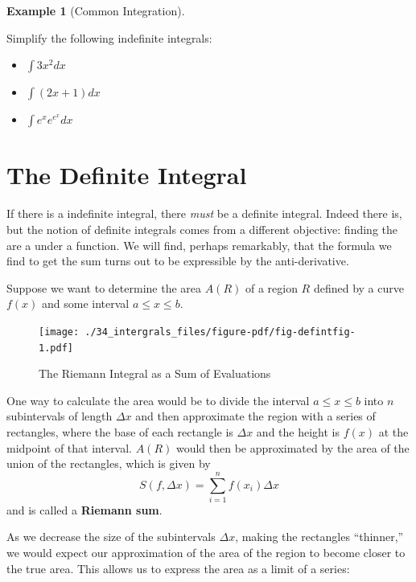 \documentclass[
  letterpaper,
]{book}
\providecommand{\tightlist}{%
  \setlength{\itemsep}{0pt}\setlength{\parskip}{0pt}}\usepackage{longtable,booktabs,array}
\theoremstyle{definition}
\theoremstyle{definition}
\newtheorem{example}{Example}[chapter]
\theoremstyle{plain}
\theoremstyle{definition}
\theoremstyle{plain}
\theoremstyle{plain}
\theoremstyle{remark}
\begin{document}
\leavevmode{}%
\begin{example}[Common Integration]\label{exm-}

Simplify the following indefinite integrals:

\begin{itemize}
\tightlist
\item
  \(\int 3x^2 dx\)
\item
  \(\int (2x+1)dx\)
\item
  \(\int e^x e^{e^x} dx\)
\end{itemize}

\end{example}

\hypertarget{the-definite-integral}{%
\section{The Definite Integral}\label{the-definite-integral}}

If there is a indefinite integral, there \emph{must} be a definite
integral. Indeed there is, but the notion of definite integrals comes
from a different objective: finding the are a under a function. We will
find, perhaps remarkably, that the formula we find to get the sum turns
out to be expressible by the anti-derivative.

Suppose we want to determine the area \(A(R)\) of a region \(R\) defined
by a curve \(f(x)\) and some interval \(a\le x \le b\).

\begin{figure}

{\centering \texttt{[image: ./34\_intergrals\_files/figure-pdf/fig-defintfig-1.pdf]}

}

\caption{\label{fig-defintfig}The Riemann Integral as a Sum of
Evaluations}

\end{figure}

One way to calculate the area would be to divide the interval
\(a\le x\le b\) into \(n\) subintervals of length \(\Delta x\) and then
approximate the region with a series of rectangles, where the base of
each rectangle is \(\Delta x\) and the height is \(f(x)\) at the
midpoint of that interval. \(A(R)\) would then be approximated by the
area of the union of the rectangles, which is given by
\[S(f,\Delta x)=\sum\limits_{i=1}^n f(x_i)\Delta x\] and is called a
\textbf{Riemann sum}.

As we decrease the size of the subintervals \(\Delta x\), making the
rectangles ``thinner,'' we would expect our approximation of the area of
the region to become closer to the true area. This allows us to express
the area as a limit of a series:
\end{document}
